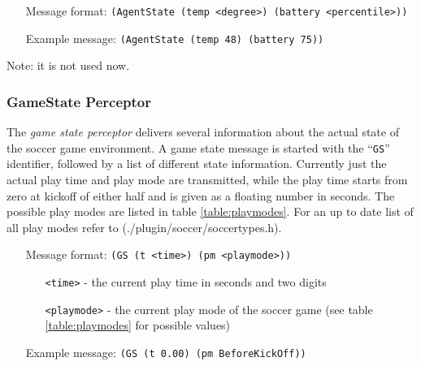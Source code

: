 \begin{itemize}
	\item[Message format:] \texttt{(AgentState (temp <degree>) (battery <percentile>))}
	\item[Example message:] \texttt{(AgentState (temp 48) (battery 75))}
\end{itemize}

Note: it is not used now.

\subsubsection{GameState Perceptor}
\label{sec:gamestateperceptor}
The \emph{game state perceptor} delivers several information about the actual
state of the soccer game environment. A game state message is started with the
``\texttt{GS}'' identifier, followed by a list of different state information.
Currently just the actual play time and play mode are transmitted, while the
play time starts from zero at kickoff of either half and is given as a floating
number in seconds. The possible play modes are listed in table
\ref{table:playmodes}. For an up to date list of all play modes refer to
(./plugin/soccer/soccertypes.h).

\begin{itemize}
	\item[Message format:] \texttt{(GS (t <time>) (pm <playmode>))}
	  \begin{itemize}
	    \item[\texttt{<time>} -] the current play time in seconds and two digits
	    \item[\texttt{<playmode>} -] the current play mode of the soccer game (see
	    table \ref{table:playmodes} for possible values)
	  \end{itemize}
	\item[Example message:] \texttt{(GS (t 0.00) (pm BeforeKickOff))}
\end{itemize}


